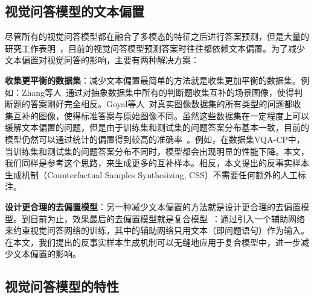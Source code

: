 \subsection{视觉问答模型的文本偏置}

尽管所有的视觉问答模型都在融合了多模态的特征之后进行答案预测，但是大量的研究工作表明~\cite{jabri2016revisiting,agrawal2016analyzing,zhang2016yin,goyal2017making}，目前的视觉问答模型预测答案时往往都依赖文本偏置。为了减少文本偏置对视觉问答的影响，主要有两种解决方案：

\begin{asparaenum}

\item \textbf{收集更平衡的数据集}：减少文本偏置最简单的方法就是收集更加平衡的数据集。例如：Zhang等人~\cite{zhang2016yin}通过对抽象数据集中所有的判断题收集互补的场景图像，使得判断题的答案刚好完全相反。Goyal等人~\cite{goyal2017making}对真实图像数据集的所有类型的问题都收集互补的图像，使得标准答案与原始图像不同。虽然这些数据集在一定程度上可以缓解文本偏置的问题，但是由于训练集和测试集的问题答案分布基本一致，目前的模型仍然可以通过统计的偏置得到较高的准确率~\cite{agrawal2018don}。例如，在数据集VQA-CP中，当训练集和测试集的问题答案分布不同时，模型都会出现明显的性能下降。本文，我们同样是参考这个思路，来生成更多的互补样本。相反，本文提出的反事实样本生成机制（Counterfactual Samples Synthesizing, CSS）不需要任何额外的人工标注。

\item \textbf{设计更合理的去偏置模型}：另一种减少文本偏置的方法就是设计更合理的去偏置模型。到目前为止，效果最后的去偏置模型就是复合模型~\cite{ramakrishnan2018overcoming,grand2019adversarial,belinkov2019don,cadene2019rubi,clark2019don,mahabadi2019simple}：通过引入一个辅助网络来约束视觉问答网络的训练，其中的辅助网络只用文本（即问题语句）作为输入。在本文，我们提出的反事实样本生成机制可以无缝地应用于复合模型中，进一步减少文本偏置的影响。

\end{asparaenum}

\subsection{视觉问答模型的特性}

